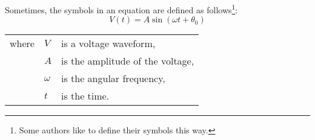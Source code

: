 \documentclass[a4paper, 10pt, conference]{ieeeconf}      %
\begin{document}
\begin{samepage}
Sometimes, the symbols in an equation are defined as follows\footnote{Some authors like to define their symbols this way.}:
\begin{equation}
	V(t)=A \sin(\omega t+\theta_0)
\end{equation}
\begin{tabular}{lll}
	where & $V$ & is a voltage waveform,\\
	& $A$ & is the amplitude of the voltage,\\
	& $\omega$ & is the angular frequency,\\
	& $t$ & is the time.
\end{tabular}
\end{samepage}
\end{document}
